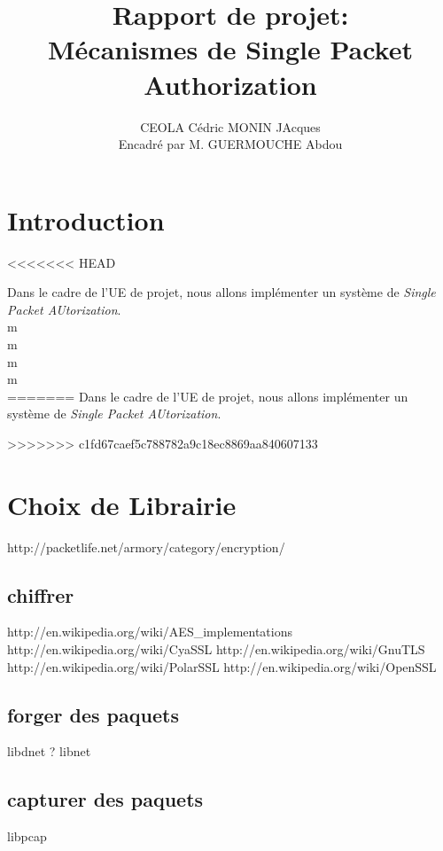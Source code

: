 \documentclass[12pt]{article}
\title{Rapport de projet:\\
Mécanismes de Single Packet Authorization}
\author{CEOLA Cédric MONIN JAcques\\
Encadré par M. GUERMOUCHE Abdou}
\begin{document}
\maketitle

\clearpage                  
\tableofcontents
\clearpage

\section{Introduction}
<<<<<<< HEAD

Dans le cadre de l'UE de projet, nous allons implémenter un système de \emph{Single Packet AUtorization}.\\
m\\
m\\
m\\
m\\
=======
Dans le cadre de l'UE de projet, nous allons implémenter un système de \emph{Single Packet AUtorization}.

>>>>>>> c1fd67caef5c788782a9c18ec8869aa840607133
\section{Choix de Librairie}

http://packetlife.net/armory/category/encryption/

\subsection{chiffrer}
http://en.wikipedia.org/wiki/AES_implementations
http://en.wikipedia.org/wiki/CyaSSL
http://en.wikipedia.org/wiki/GnuTLS
http://en.wikipedia.org/wiki/PolarSSL
http://en.wikipedia.org/wiki/OpenSSL

\subsection{forger des paquets}
libdnet ?
libnet

\subsection{capturer des paquets}
libpcap
\end{document}

